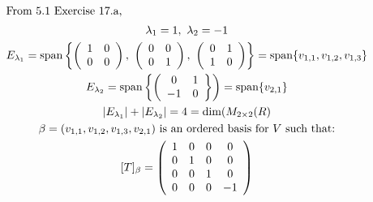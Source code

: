 \documentclass[12pt]{article}
\newenvironment{problem}[2][Problem]{\begin{trivlist}
\item[\hskip \labelsep {\bfseries #1}\hskip \labelsep {\bfseries #2.}]}{\end{trivlist}}
\begin{document}
\begin{problem}{3.f}
\end{problem}
\begin{gather*}
	\intertext{From 5.1 Exercise 17.a,}
	\lambda_1 = 1,\ \lambda_2 = -1 \\
	E_{\lambda_1} = \text{span} \left\{
		\left( \begin{array}{cc}
			1 & 0 \\
			0 & 0 \\
		\end{array} \right),\ 
		\left( \begin{array}{cc}
			0 & 0 \\
			0 & 1 \\
		\end{array} \right),\ 
		\left( \begin{array}{cc}
			0 & 1 \\
			1 & 0 \\
		\end{array} \right)
	\right\} = \text{span}\{v_{1,1}, v_{1,2}, v_{1,3}\} \\
	E_{\lambda_2} = \text{span} \left\{
		\left( \begin{array}{cc}
			0 & 1 \\
			-1 & 0 \\
		\end{array} \right\}
	\right) = \text{span}\{v_{2,1}\} \\
	|E_{\lambda_1}| + |E_{\lambda_2}| = 4 = \text{dim}(M_{2 \times 2}(R) \\
	\beta = (v_{1,1}, v_{1,2}, v_{1,3}, v_{2,1}) 
		\text{ is an ordered basis for $V$ such that:}\\
	[T]_\beta = 
		\left( \begin{array}{cccc}
			1 & 0 & 0 & 0\\
			0 & 1 & 0 & 0\\
			0 & 0 & 1 & 0\\
			0 & 0 & 0 & -1\\
		\end{array} \right)
\end{gather*}
\filbreak
\end{document}
